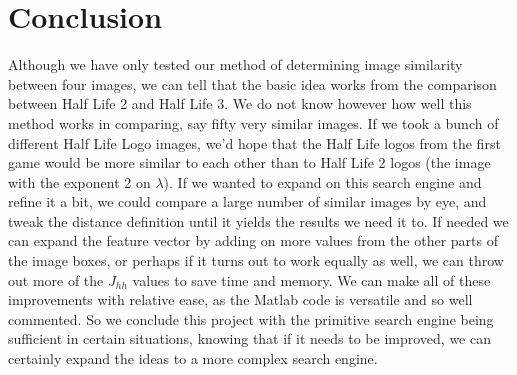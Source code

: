 \documentclass[11 pt]{article}
\begin{document}
\section{Conclusion}
\indent\indent Although we have only tested our method of determining image similarity between four images, we can tell that the basic idea works from the comparison between Half Life 2 and Half Life 3. We do not know however how well this method works in comparing, say fifty very similar images. If we took a bunch of different Half Life Logo images, we'd hope that the Half Life logos from the first game would be more similar to each other than to Half Life 2 logos (the image with the exponent 2 on $\lambda$). If we wanted to expand on this search engine and refine it a bit, we could compare a large number of similar images by eye, and tweak the distance definition until it yields the results we need it to. If needed we can expand the feature vector by adding on more values from the other parts of the image boxes, or perhaps if it turns out to work equally as well, we can throw out more of the $J_{hh}$ values to save time and memory. We can make all of these improvements with relative ease, as the Matlab code is versatile and so well commented. So we conclude this project with the primitive search engine being sufficient in certain situations, knowing that if it needs to be improved, we can certainly expand the ideas to a more complex search engine.
\end{document}
